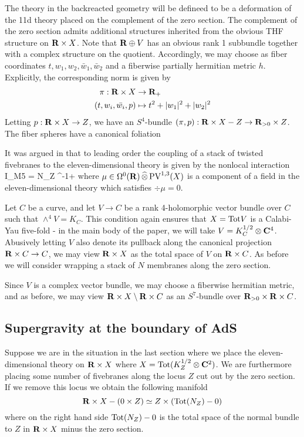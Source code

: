 \documentclass[11pt]{amsart}%
\begin{document}
The theory in the backreacted geometry will be defineed to be a deformation of the 11d theory placed on the complement of the zero section. The complement of the zero section admits additional structures inherited from the obvious THF structure on $\mathbf{R} \times X$. Note that $\mathbf{R}\oplus V$ has an obvious rank 1 subbundle together with a complex structure on the quotient. Accordingly, we may choose as fiber coordinates $t, w_{1}, w_{2}, \bar w_{1}, \bar w_{2}$ and a fiberwise partially hermitian metric $h$. Explicitly, the corresponding norm is given by
\begin{align*}
 \pi:  \mathbf{R}\times X & \to \mathbf{R}_{+} \\
  (t, w_{i}, \bar{w_{i}}, p)& \mapsto t^{2} + |w_{1}|^{2}+|w_{2}|^{2}
\end{align*}
Letting $p : \mathbf{R}\times X \to Z$, we have an $S^{4}$-bundle $(\pi, p) : \mathbf{R}\times X - Z \to \mathbf{R}_{>0}\times Z$. The fiber spheres have a canonical foliation


It was argued in \cite{RSW} that to leading order the coupling of a stack of twisted fivebranes to the eleven-dimensional theory is given by the nonlocal interaction 
\beqn\label{eqn:br1}
I_{M5} = N\int_{Z} \div^{-1}\mu \vee \Omega +\cdots 
\eeqn
where $\mu \in \Omega^0 (\mathbf{R}) \, \widehat{\otimes} \, {\rm PV}^{1,3}(X)$ is a component of a field in the eleven-dimensional theory which satisfies $\div \mu = 0$.

\parsec
Let $C$ be a curve, and let $V\to C$ be a rank 4-holomorphic vector bundle over $C$ such that $\wedge^{4} V = K_{C}$. This condition again ensures that $X = {\rm Tot} V$ is a Calabi-Yau five-fold - in the main body of the paper, we will take $V = K^{1/2}_{C}\otimes \mathbf{C}^{4}$. Abusively letting $V$ also denote its pullback along the canonical projection $\mathbf{R}\times C \to C$, we may view $\mathbf{R}\times X$ as the total space of $V$ on $\mathbf{R}\times C$. As before we will consider wrapping a stack of $N$ membranes along the zero section.

Since $V$ is a complex vector bundle, we may choose a fiberwise hermitian metric, and as before, we may view $\mathbf{R}\times X \setminus \mathbf{R}\times C$ as an $S^{7}$-bundle over $\mathbf{R}_{>0}\times \mathbf{R}\times C$.




\subsection{Supergravity at the boundary of AdS}

Suppose we are in the situation in the last section where we place the eleven-dimensional theory on $\mathbf{R} \times X$ where $X = {\rm Tot}(K^{1/2}_Z \otimes \mathbf{C}^2)$. 
We are furthermore placing some number of fivebranes along the locus $Z$ cut out by the zero section. 
If we remove this locus we obtain the following manifold 
\[
\mathbf{R} \times X - \left(0 \times Z\right) \simeq Z \times \left({\rm Tot}(N_Z) - 0\right) 
\]
where on the right hand side ${\rm Tot}(N_Z) - 0$ is the total space of the normal bundle to $Z$ in $\mathbf{R} \times X$ minus the zero section.
\end{document}
